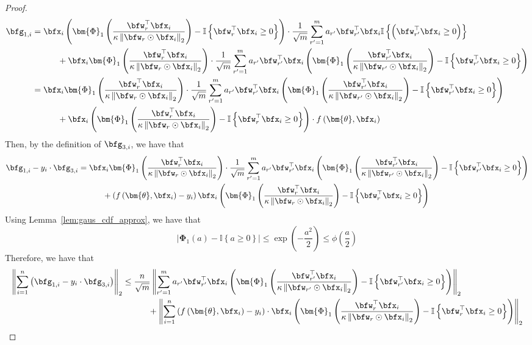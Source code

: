 \documentclass[10pt]{article} %
\theoremstyle{definition}
\theoremstyle{plain}
\newcommand{\paren}[1]{\left(#1\right)}
\newcommand{\norm}[1]{\left\|#1\right\|}
\newcommand{\indy}[1]{\mathbb{I}\left\{#1\right\}}
\begin{document}
\begin{proof}
\begin{align*}
        \bfg_{1,i} & = \bfx_i\paren{\bm{\Phi}_1\paren{\frac{\bfw_r^\top\bfx_i}{\kappa\norm{\bfw_r\odot\bfx_i}_2}} - \indy{\bfw_r^\top\bfx_i\geq 0}}\cdot \frac{1}{\sqrt{m}}\sum_{r'=1}^ma_{r'}\bfw_{r'}^\top\bfx_i\indy{\paren{\bfw_{r'}^\top\bfx_i\geq 0}}\\
        & \quad\quad\quad + \bfx_i\bm{\Phi}_1\paren{\frac{\bfw_r^\top\bfx_i}{\kappa\norm{\bfw_r\odot\bfx_i}_2}}\cdot \frac{1}{\sqrt{m}}\sum_{r'=1}^ma_{r'}\bfw_{r'}^\top\bfx_i\paren{\bm{\Phi}_1\paren{\frac{\bfw_{r'}^\top\bfx_i}{\kappa\norm{\bfw_{r'}\odot\bfx_i}_2}} - \indy{\bfw_{r'}^\top\bfx_i\geq 0}}\\
        & = \bfx_i\bm{\Phi}_1\paren{\frac{\bfw_r^\top\bfx_i}{\kappa\norm{\bfw_r\odot\bfx_i}_2}}\cdot \frac{1}{\sqrt{m}}\sum_{r'=1}^ma_{r'}\bfw_{r'}^\top\bfx_i\paren{\bm{\Phi}_1\paren{\frac{\bfw_{r'}^\top\bfx_i}{\kappa\norm{\bfw_{r'}\odot\bfx_i}_2}} - \indy{\bfw_{r'}^\top\bfx_i\geq 0}}\\
        & \quad\quad\quad + \bfx_i\paren{\bm{\Phi}_1\paren{\frac{\bfw_r^\top\bfx_i}{\kappa\norm{\bfw_r\odot\bfx_i}_2}} - \indy{\bfw_r^\top\bfx_i\geq 0}}\cdot f\paren{\bm{\theta},\bfx_i}
    \end{align*}
    Then, by the definition of $\bfg_{3,i}$, we have that
    \begin{align*}
        \bfg_{1,i} - y_i\cdot\bfg_{3,i} & = \bfx_i\bm{\Phi}_1\paren{\frac{\bfw_r^\top\bfx_i}{\kappa\norm{\bfw_r\odot\bfx_i}_2}}\cdot \frac{1}{\sqrt{m}}\sum_{r'=1}^ma_{r'}\bfw_{r'}^\top\bfx_i\paren{\bm{\Phi}_1\paren{\frac{\bfw_{r'}^\top\bfx_i}{\kappa\norm{\bfw_{r'}\odot\bfx_i}_2}} - \indy{\bfw_{r'}^\top\bfx_i\geq 0}}\\
        & \quad\quad\quad + \paren{f\paren{\bm{\theta},\bfx_i} - y_i}\bfx_i\paren{\bm{\Phi}_1\paren{\frac{\bfw_r^\top\bfx_i}{\kappa\norm{\bfw_r\odot\bfx_i}_2}} - \indy{\bfw_r^\top\bfx_i\geq 0}}
    \end{align*}
    Using Lemma~\ref{lem:gaus_cdf_approx}, we have that 
    \[
        \left|\bm{\Phi}_1\paren{a} - \indy{a\geq 0}\right|\leq \exp\paren{-\frac{a^2}{2}} \leq \phi\paren{\frac{a}{2}}
    \]
    Therefore, we have that 
    \begin{align*}
        \norm{\sum_{i=1}^n\paren{\bfg_{1,i} - y_i\cdot\bfg_{3,i}}}_2 & \leq \frac{n}{\sqrt{m}}\norm{ \sum_{r'=1}^ma_{r'}\bfw_{r'}^\top\bfx_i\paren{\bm{\Phi}_1\paren{\frac{\bfw_{r'}^\top\bfx_i}{\kappa\norm{\bfw_{r'}\odot\bfx_i}_2}} - \indy{\bfw_{r'}^\top\bfx_i\geq 0}}}_2 \\
        & \quad\quad\quad + \norm{\sum_{i=1}^n\paren{f\paren{\bm{\theta},\bfx_i} - y_i}\cdot\bfx_i\paren{\bm{\Phi}_1\paren{\frac{\bfw_r^\top\bfx_i}{\kappa\norm{\bfw_r\odot\bfx_i}_2}} - \indy{\bfw_r^\top\bfx_i\geq 0}}}_2\\

\end{align*}
\end{proof}
\end{document}
